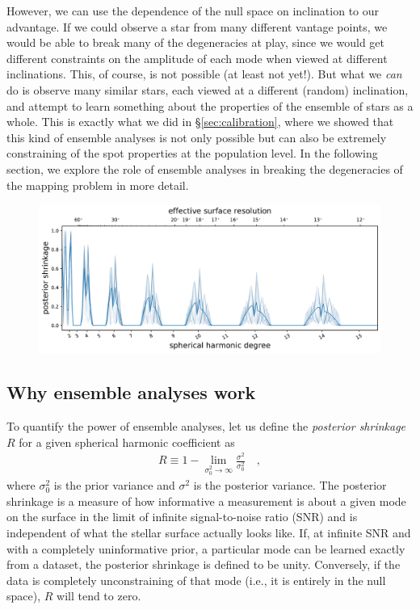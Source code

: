 \documentclass[modern]{aastex62}
\begin{document}
However, we can use the dependence of the null space on inclination to our
advantage. If we could observe a star from many different vantage points,
we would be able to break many of the degeneracies at play, since we
would get different constraints on the amplitude of each mode when viewed
at different inclinations. This, of course, is not possible (at least not
yet!). But what we \emph{can} do is observe many similar stars, each viewed
at a different (random) inclination, and attempt to learn something about
the properties of the ensemble of stars as a whole. This is exactly
what we did in \S\ref{sec:calibration}, where we showed that this kind
of ensemble analyses is not only possible but can also be extremely
constraining of the spot properties at the population level. In the
following section, we explore the role of ensemble analyses in breaking
the degeneracies of the mapping problem in more detail.

\begin{figure}[t!]
    \begin{centering}
        \includegraphics[width=\linewidth]{figures/nullspace_ensemble_single.pdf}
    \end{centering}
\end{figure}

\subsection{Why ensemble analyses work}
\label{sec:ensemble}

To quantify the power of ensemble analyses,
let us define the \emph{posterior shrinkage} $R$ for a given
spherical harmonic coefficient as
%
\begin{align}
    \label{eq:shrinkage}
    R \equiv 1 - \lim\limits_{\sigma_0^2 \rightarrow \infty}
    \frac{\sigma^2}{\sigma_0^2}
    \quad,
\end{align}
%
where $\sigma_0^2$ is the prior variance
and $\sigma^2$ is the posterior variance.
The posterior shrinkage is a measure of how informative a measurement is about a
given mode on the surface in the limit of infinite signal-to-noise ratio (SNR)
and is independent of what the stellar surface actually looks like.
If, at infinite SNR and with a completely uninformative prior,
a particular mode can be learned exactly from a dataset, the posterior
shrinkage is defined to be unity. Conversely, if the data is completely
unconstraining of that mode (i.e., it is entirely in the null space),
$R$ will tend to zero.
\end{document}
